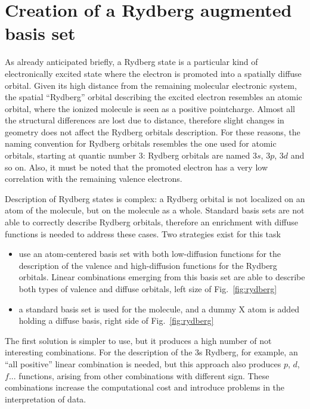 \section{Creation of a Rydberg augmented basis set}
\label{sec:rydberg_procedure}

As already anticipated briefly, a Rydberg state is a particular kind of
electronically excited state where the electron is promoted into a
spatially diffuse orbital.  Given its high distance from the remaining
molecular electronic system, the spatial ``Rydberg'' orbital describing the
excited electron resembles an atomic orbital, where the ionized molecule is
seen as a positive pointcharge.  Almost all the structural differences are
lost due to distance, therefore slight changes in geometry does not affect
the Rydberg orbitals description.  For these reasons, the naming convention
for Rydberg orbitals resembles the one used for atomic orbitals, starting at
quantic number 3: Rydberg orbitals are named $3s$, $3p$, $3d$ and so on.
Also, it must be noted that the promoted electron has a very low correlation
with the remaining valence electrons.

Description of Rydberg states is complex: a Rydberg orbital is not
localized on an atom of the molecule, but on the molecule as a whole.
Standard basis sets are not able to correctly describe Rydberg orbitals,
therefore an enrichment with diffuse functions is needed to address these
cases. Two strategies exist for this task
\begin{itemize}
\item use an atom-centered basis set with both low-diffusion functions for the
description of the valence and high-diffusion functions for the Rydberg
orbitals. Linear combinations emerging from this basis set are able to describe
both types of valence and diffuse orbitals, left size of Fig.~\ref{fig:rydberg}
\item a standard basis set is used for the molecule, and a dummy X atom is added
holding a diffuse basis, right side of Fig.~\ref{fig:rydberg}
\end{itemize}

The first solution is simpler to use, but it produces a high number of not
interesting combinations. For the description of the 3s Rydberg, for
example, an ``all positive'' linear combination is needed, but this approach
also produces $p$, $d$, $f$... functions, arising from other combinations with
different sign. These combinations increase the computational cost and
introduce problems in the interpretation of data. 

